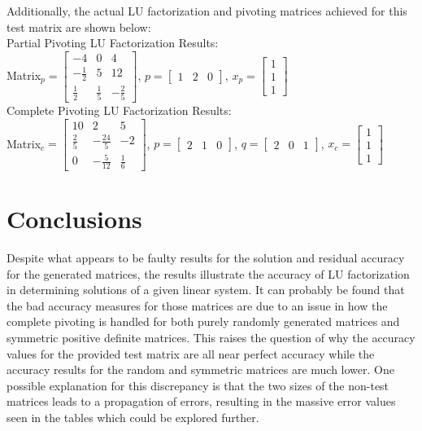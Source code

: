 \documentclass[11pt]{article}
\begin{document}
Additionally, the actual LU factorization and pivoting matrices achieved for this test matrix are shown below: \\
Partial Pivoting LU Factorization Results: \\
Matrix$_p = \begin{bmatrix} -4 & 0 & 4 \\
				    -\frac{1}{2} & 5 & 12 \\
				    \frac{1}{2} & \frac{1}{5} & -\frac{2}{5}
		 \end{bmatrix}$,
$p = \begin{bmatrix} 1 & 2 & 0 \end{bmatrix}$,
$x_p = \begin{bmatrix} 1 \\ 1 \\ 1  \end{bmatrix}$ \\

Complete Pivoting LU Factorization Results: \\
Matrix$_c = \begin{bmatrix} 10 & 2 & 5 \\
				    \frac{2}{5} & -\frac{24}{5} & -2 \\
				    0& -\frac{5}{12} & \frac{1}{6}
		 \end{bmatrix}$,
$p = \begin{bmatrix} 2 & 1 & 0 \end{bmatrix}$,
$q = \begin{bmatrix} 2 & 0 & 1 \end{bmatrix}$,
$x_c = \begin{bmatrix} 1 \\ 1 \\ 1  \end{bmatrix}$


\section{Conclusions}

Despite what appears to be faulty results for the solution and residual accuracy for the generated matrices, the results illustrate the accuracy of LU factorization in determining solutions of a given linear system. It can probably be found that the bad accuracy measures for those matrices are due to an issue in how the complete pivoting is handled for both purely randomly generated matrices and symmetric positive definite matrices. This raises the question of why the accuracy values for the provided test matrix are all near perfect accuracy while the accuracy results for the random and symmetric matrices are much lower. One possible explanation for this discrepancy is that the two sizes of the non-test matrices leads to a propagation of errors, resulting in the massive error values seen in the tables which could be explored further.
\end{document}
